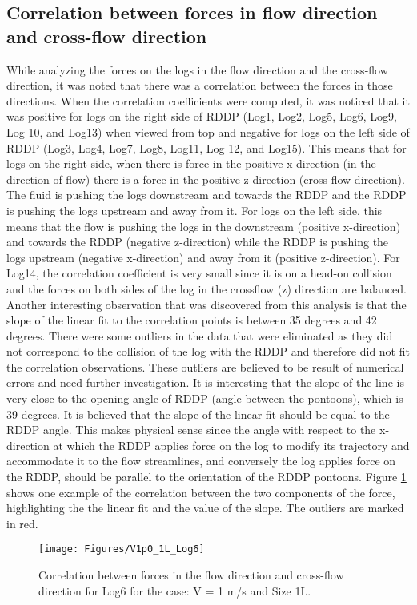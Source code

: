 \FloatBarrier
\subsection{Correlation between forces in flow direction and cross-flow direction}
While analyzing the forces on the logs in the flow direction and the cross-flow direction, it was noted that there was a correlation between the forces in those directions. When the correlation coefficients were computed, it was noticed that it was positive for logs on the right side of RDDP (Log1, Log2, Log5, Log6, Log9, Log 10, and Log13) when viewed from top and negative for logs on the left side of RDDP (Log3, Log4, Log7, Log8, Log11, Log 12, and Log15). This means that for logs on the right side, when there is force in the positive x-direction (in the direction of flow) there is a force in the positive z-direction (cross-flow direction). The fluid is pushing the logs downstream and towards the RDDP and the RDDP is pushing the logs upstream and away from it. For logs on the left side, this means that the flow is pushing the logs in the downstream (positive x-direction) and towards the RDDP (negative z-direction) while the RDDP is pushing the logs upstream (negative x-direction) and away from it (positive z-direction). For Log14, the correlation coefficient is very small since it is on a head-on collision and the forces on both sides of the log in the crossflow (z) direction are balanced.\\
Another interesting observation that was discovered from this analysis is that the slope of the linear fit to the correlation points is between 35 degrees and 42 degrees. There were some outliers in the data that were eliminated as they did not correspond to the collision of the log with the RDDP and therefore did not fit the correlation observations. These outliers are believed to be result of numerical errors and need further investigation. It is interesting that the slope of the line is very close to the opening angle of RDDP (angle between the pontoons), which is 39 degrees. It is believed that the slope of the linear fit should be equal to the RDDP angle. This makes physical sense since the angle with respect to the x-direction at which the RDDP applies force on the log to modify its trajectory and accommodate it to the flow streamlines, and conversely the log applies force on the RDDP, should be parallel to the orientation of the RDDP pontoons. Figure \ref{fig:V1p0_1L_Log6} shows one example of the correlation between the two components of the force, highlighting the the linear fit and the value of the slope. The outliers are marked in red.

\begin{figure}
\centering
\texttt{[image: Figures/V1p0\_1L\_Log6]}
\caption{\label{fig:V1p0_1L_Log6}Correlation between forces in the flow direction and cross-flow direction for Log6 for the case: V = 1 m/s and Size 1L.}
\end{figure}